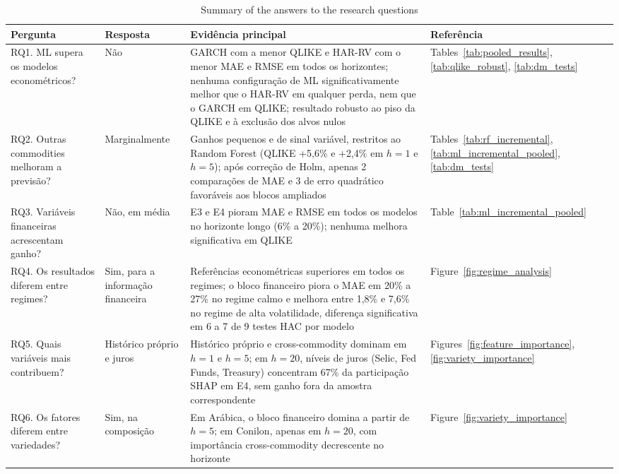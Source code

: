 \documentclass[a4paper,fleqn]{cas-sc}
\begin{document}
\begin{table}[t]
\centering
\caption{Summary of the answers to the research questions}
\label{tab:rq_summary}
\scriptsize
\setlength{\tabcolsep}{3pt}
\begin{tabular*}{\textwidth}{@{\extracolsep{\fill}}p{3.4cm}p{2.1cm}p{7.6cm}p{2.2cm}@{}}
\hline
Pergunta & Resposta & Evidência principal & Referência \\
\hline
RQ1. ML supera os modelos econométricos? & Não & GARCH com a menor QLIKE e HAR-RV com o menor MAE e RMSE em todos os horizontes; nenhuma configuração de ML significativamente melhor que o HAR-RV em qualquer perda, nem que o GARCH em QLIKE; resultado robusto ao piso da QLIKE e à exclusão dos alvos nulos & Tables~\ref{tab:pooled_results}, \ref{tab:qlike_robust}, \ref{tab:dm_tests} \\
\hline
RQ2. Outras commodities melhoram a previsão? & Marginalmente & Ganhos pequenos e de sinal variável, restritos ao Random Forest (QLIKE +5,6\% e +2,4\% em \(h=1\) e \(h=5\)); após correção de Holm, apenas 2 comparações de MAE e 3 de erro quadrático favoráveis aos blocos ampliados & Tables~\ref{tab:rf_incremental}, \ref{tab:ml_incremental_pooled}, \ref{tab:dm_tests} \\
\hline
RQ3. Variáveis financeiras acrescentam ganho? & Não, em média & E3 e E4 pioram MAE e RMSE em todos os modelos no horizonte longo (6\% a 20\%); nenhuma melhora significativa em QLIKE & Table~\ref{tab:ml_incremental_pooled} \\
\hline
RQ4. Os resultados diferem entre regimes? & Sim, para a informação financeira & Referências econométricas superiores em todos os regimes; o bloco financeiro piora o MAE em 20\% a 27\% no regime calmo e melhora entre 1,8\% e 7,6\% no regime de alta volatilidade, diferença significativa em 6 a 7 de 9 testes HAC por modelo & Figure~\ref{fig:regime_analysis} \\
\hline
RQ5. Quais variáveis mais contribuem? & Histórico próprio e juros & Histórico próprio e cross-commodity dominam em \(h=1\) e \(h=5\); em \(h=20\), níveis de juros (Selic, Fed Funds, Treasury) concentram 67\% da participação SHAP em E4, sem ganho fora da amostra correspondente & Figures~\ref{fig:feature_importance}, \ref{fig:variety_importance} \\
\hline
RQ6. Os fatores diferem entre variedades? & Sim, na composição & Em Arábica, o bloco financeiro domina a partir de \(h=5\); em Conilon, apenas em \(h=20\), com importância cross-commodity decrescente no horizonte & Figure~\ref{fig:variety_importance} \\
\hline
\end{tabular*}
\end{table}
\end{document}
